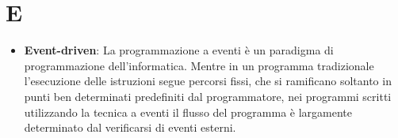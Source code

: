 \section{E}
\begin{itemize} 
	\item
	\textbf{Event-driven}: La programmazione a eventi è un paradigma di programmazione dell'informatica. Mentre in un programma tradizionale l'esecuzione delle istruzioni segue percorsi fissi, che si ramificano soltanto in punti ben determinati predefiniti dal programmatore, nei programmi scritti utilizzando la tecnica a eventi il flusso del programma è largamente determinato dal verificarsi di eventi esterni.
\end{itemize}